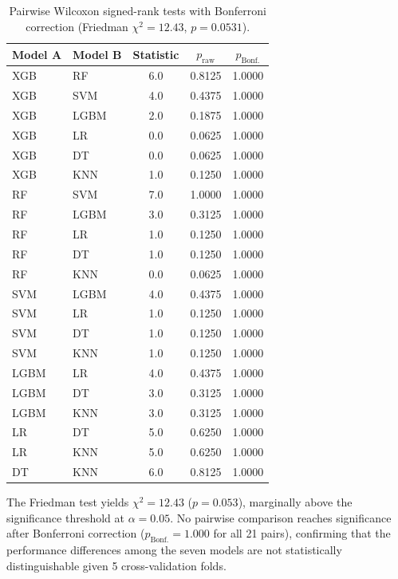 \begin{table}[htbp]
  \centering
  \caption[Pairwise Wilcoxon tests with Bonferroni correction]{Pairwise Wilcoxon signed-rank tests with Bonferroni correction (Friedman $\chi^2 = 12.43$, $p = 0.0531$).}
  \label{tab:app_pairwise}
  \small
  \begin{tabular}{llccc}
    \toprule
    Model A & Model B & Statistic & $p_\text{raw}$ & $p_\text{Bonf.}$ \\
    \midrule
    XGB  & RF   & 6.0 & 0.8125 & 1.0000 \\
    XGB  & SVM  & 4.0 & 0.4375 & 1.0000 \\
    XGB  & LGBM & 2.0 & 0.1875 & 1.0000 \\
    XGB  & LR   & 0.0 & 0.0625 & 1.0000 \\
    XGB  & DT   & 0.0 & 0.0625 & 1.0000 \\
    XGB  & KNN  & 1.0 & 0.1250 & 1.0000 \\
    RF   & SVM  & 7.0 & 1.0000 & 1.0000 \\
    RF   & LGBM & 3.0 & 0.3125 & 1.0000 \\
    RF   & LR   & 1.0 & 0.1250 & 1.0000 \\
    RF   & DT   & 1.0 & 0.1250 & 1.0000 \\
    RF   & KNN  & 0.0 & 0.0625 & 1.0000 \\
    SVM  & LGBM & 4.0 & 0.4375 & 1.0000 \\
    SVM  & LR   & 1.0 & 0.1250 & 1.0000 \\
    SVM  & DT   & 1.0 & 0.1250 & 1.0000 \\
    SVM  & KNN  & 1.0 & 0.1250 & 1.0000 \\
    LGBM & LR   & 4.0 & 0.4375 & 1.0000 \\
    LGBM & DT   & 3.0 & 0.3125 & 1.0000 \\
    LGBM & KNN  & 3.0 & 0.3125 & 1.0000 \\
    LR   & DT   & 5.0 & 0.6250 & 1.0000 \\
    LR   & KNN  & 5.0 & 0.6250 & 1.0000 \\
    DT   & KNN  & 6.0 & 0.8125 & 1.0000 \\
    \bottomrule
  \end{tabular}
\end{table}

The Friedman test yields $\chi^2 = 12.43$ ($p = 0.053$), marginally above the significance threshold at $\alpha = 0.05$.
No pairwise comparison reaches significance after Bonferroni correction ($p_\text{Bonf.} = 1.000$ for all 21 pairs), confirming that the performance differences among the seven models are not statistically distinguishable given 5 cross-validation folds.
